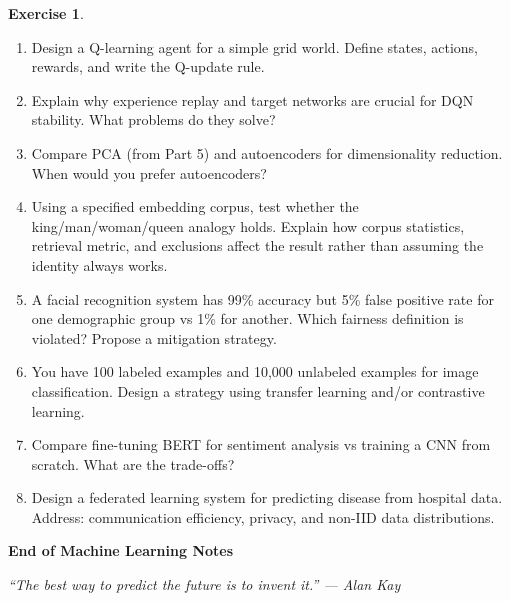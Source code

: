 \documentclass[11pt,twoside]{article}
\numberwithin{equation}{section}
\theoremstyle{plain}
\theoremstyle{definition}
\newtheorem{exercise}[theorem]{Exercise}
\theoremstyle{remark}
\begin{document}
\begin{exercise}
\begin{enumerate}
\item Design a Q-learning agent for a simple grid world. Define states, actions, rewards, and write the Q-update rule.

\item Explain why experience replay and target networks are crucial for DQN stability. What problems do they solve?

\item Compare PCA (from Part 5) and autoencoders for dimensionality reduction. When would you prefer autoencoders?

\item Using a specified embedding corpus, test whether the king/man/woman/queen analogy holds. Explain how corpus statistics, retrieval metric, and exclusions affect the result rather than assuming the identity always works.

\item A facial recognition system has 99\% accuracy but 5\% false positive rate for one demographic group vs 1\% for another. Which fairness definition is violated? Propose a mitigation strategy.

\item You have 100 labeled examples and 10,000 unlabeled examples for image classification. Design a strategy using transfer learning and/or contrastive learning.

\item Compare fine-tuning BERT for sentiment analysis vs training a CNN from scratch. What are the trade-offs?

\item Design a federated learning system for predicting disease from hospital data. Address: communication efficiency, privacy, and non-IID data distributions.
\end{enumerate}
\end{exercise}

\vspace{1cm}

\begin{center}
\Large\textbf{End of Machine Learning Notes}

\vspace{0.5cm}

\textit{``The best way to predict the future is to invent it.'' --- Alan Kay}
\end{center}
\end{document}
